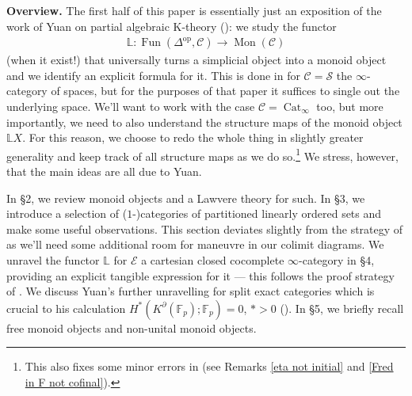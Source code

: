 \documentclass[12pt, reqno]{amsart}
\theoremstyle{plain}
\theoremstyle{definition}
\newcommand{\F}{\mathbb F}
\begin{document}
\textbf{Overview.} The first half of this paper is essentially just an exposition of the work of Yuan on partial algebraic K-theory (\cite{Yuan}): we study the functor
\begin{align*}
\mathbb{L}\colon \operatorname{Fun}(\Delta^{\operatorname{op}},\mathcal{C})\rightarrow \operatorname{Mon}(\mathcal{C})
\end{align*}
(when it exist!) that universally turns a simplicial object into a monoid object and we identify an explicit formula for it. This is done in \cite{Yuan} for $\mathcal{C}=\mathcal{S}$ the $\infty$-category of spaces, but for the purposes of that paper it suffices to single out the underlying space. We'll want to work with the case $\mathcal{C}=\operatorname{Cat}_\infty$ too, but more importantly, we need to also understand the structure maps of the monoid object $\mathbb{L}X$. For this reason, we choose to redo the whole thing in slightly greater generality and keep track of all structure maps as we do so.\footnote{This also fixes some minor errors in \cite{Yuan} (see Remarks \ref{eta not initial} and \ref{Fred in F not cofinal}).} We stress, however, that the main ideas are all due to Yuan.

In \S 2, we review monoid objects and a Lawvere theory for such. In \S 3, we introduce a selection of ($1$-)categories of partitioned linearly ordered sets and make some useful observations. This section deviates slightly from the strategy of \cite{Yuan} as we'll need some additional room for maneuvre in our colimit diagrams. We unravel the functor $\mathbb{L}$ for $\mathcal{E}$ a cartesian closed cocomplete $\infty$-category in \S 4, providing an explicit tangible expression for it --- this follows the proof strategy of \cite[Proposition 5.10]{Yuan}. We discuss Yuan's further unravelling for split exact categories which is crucial to his calculation $H^*(K^\partial (\F_p);\F_p)=0$, $\ast>0$ (\cite[Theorem 5.2]{Yuan}). In \S 5, we briefly recall free monoid objects and non-unital monoid objects.
\end{document}
